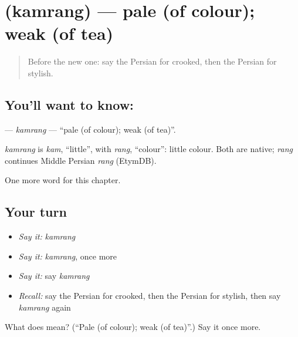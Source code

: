 \section[\texorpdfstring{\fa{کمرنگ} (kamrang)}{کمرنگ (kamrang)}]{ (kamrang) — pale (of colour); weak (of tea)}

\label{lesson:FA-C202-kamrang}



\begin{quote}
Before the new one: say the Persian for crooked, then the Persian for stylish.
\end{quote}

\subsection*{You'll want to know: }
\textbf{} — \emph{kamrang} — \textquotedblleft{}pale (of colour); weak (of tea)\textquotedblright{}.

\begin{cousinweb}
\emph{kamrang} is \emph{kam}, \textquotedblleft{}little\textquotedblright{}, with \emph{rang}, \textquotedblleft{}colour\textquotedblright{}: little colour. Both are native; \emph{rang} continues Middle Persian \emph{rang} (EtymDB).
\end{cousinweb}

\begin{grammarlens}[title={What you've built}]
One more word for this chapter.
\end{grammarlens}

\subsection*{Your turn}
\begin{itemize}
\raggedright
  \item \emph{Say it:} \emph{kamrang}
  \item \emph{Say it:} \emph{kamrang}, once more
  \item \emph{Say it:} say \emph{kamrang}
  \item \emph{Recall:} say the Persian for crooked, then the Persian for stylish, then say \emph{kamrang} again
\end{itemize}

\begin{tcolorbox}[breakable,colback=teal!4,colframe=teal!35!black,title={Before you move on}]
What does  mean? (\textquotedblleft{}Pale (of colour); weak (of tea)\textquotedblright{}.) Say it once more.
\end{tcolorbox}

